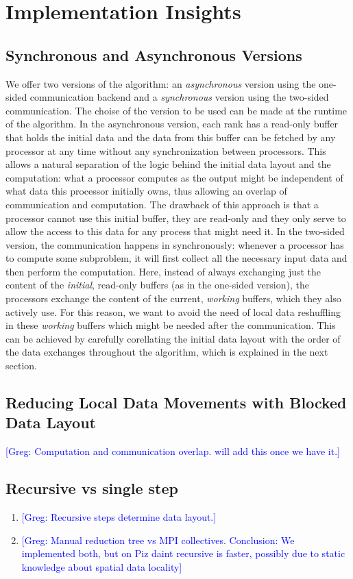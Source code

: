\documentclass[sigplan,review,anonymous]{acmart}\settopmatter{printfolios=true,printccs=false,printacmref=false}
\newcommand\greg[1]{\textcolor{blue}{[Greg: #1]}}
\begin{document}
\section{Implementation Insights}
\label{sec:implementation}

\subsection{Synchronous and Asynchronous Versions}
We offer two versions of the algorithm: an \emph{asynchronous} version using the one-sided communication backend and a \emph{synchronous} version using the two-sided communication. The choise of the version to be used can be made at the runtime of the algorithm. In the asynchronous version, each rank has a read-only buffer that holds the initial data and the data from this buffer can be fetched by any processor at any time without any synchronization between processors. This allows a natural separation of the logic behind the initial data layout and the computation: what a processor computes as the output might be independent of what data this processor initially owns, thus allowing an overlap of communication and computation. The drawback of this approach is that a processor cannot use this initial buffer, they are read-only and they only serve to allow the access to this data for any process that might need it. In the two-sided version, the communication happens in synchronously: whenever a processor has to compute some subproblem, it will first collect all the necessary input data and then perform the computation. Here, instead of always exchanging just the content of the \emph{initial}, read-only buffers (as in the one-sided version), the processors exchange the content of the current, \emph{working} buffers, which they also actively use. For this reason, we want to avoid the need of local data reshuffling in these \emph{working} buffers which might be needed after the communication. This can be achieved by carefully corellating the initial data layout with the order of the data exchanges throughout the algorithm, which is explained in the next section. 

\subsection{Reducing Local Data Movements with Blocked Data Layout}

 \greg{Computation and communication overlap. will add this once we have it.}
\subsection{Recursive vs single step}
\begin{enumerate}
	\item \greg{Recursive steps determine data layout.}
	\item \greg{Manual reduction tree vs MPI collectives. Conclusion: We 
	implemented both, but on Piz daint recursive is faster, possibly due to 
	static knowledge about spatial data locality}
\end{enumerate}
\end{document}

